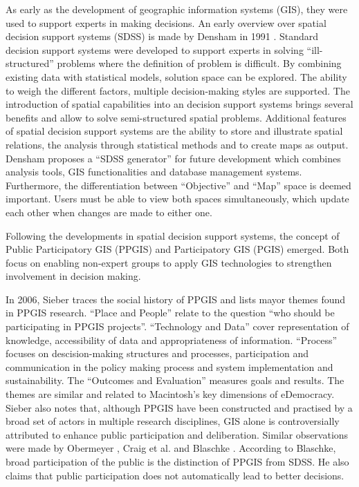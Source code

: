 As early as the development of geographic information systems (GIS), they were used to support experts in making decisions. An early overview over spatial decision support systems (SDSS) is made by Densham in 1991 \cite{densham_sdss}. Standard decision support systems were developed to support experts in solving ``ill-structured'' problems where the definition of problem is difficult. By combining existing data with statistical models, solution space can be explored. The ability to weigh the different factors, multiple decision-making styles are supported. The introduction of spatial capabilities into an decision support systems brings several benefits and allow to solve semi-structured spatial problems. Additional features of spatial decision support systems are the ability to store and illustrate spatial relations, the analysis through statistical methods and to create maps as output. Densham proposes a ``SDSS generator'' for future development which combines analysis tools, GIS functionalities and database management systems. Furthermore, the differentiation between ``Objective'' and ``Map'' space is deemed important. Users must be able to view both spaces simultaneously, which update each other when changes are made to either one.

Following the developments in spatial decision support systems, the concept of Public Participatory GIS (PPGIS) and Participatory GIS (PGIS) emerged. Both focus on enabling non-expert groups to apply GIS technologies to strengthen involvement in decision making.

In 2006, Sieber \cite{Sieber2006_PublicParticipationGIS} traces the social history of PPGIS and lists mayor themes found in PPGIS research. ``Place and People'' relate to the question ``who should be participating in PPGIS projects''. ``Technology and Data'' cover representation of knowledge, accessibility of data and appropriateness of information. ``Process'' focuses on descision-making structures and processes, participation and communication in the policy making process and system implementation and sustainability. The ``Outcomes and Evaluation'' measures goals and results. The themes are similar and related to Macintosh's \cite{Macintosh2004_eParticipation_characterization} key dimensions of eDemocracy. Sieber also notes that, although PPGIS have been constructed and practised by a broad set of actors in multiple research disciplines, GIS alone is controversially attributed to enhance public participation and deliberation. Similar observations were made by Obermeyer \cite{obermeyer1998evolution}, Craig et al. \cite{Weiner2002_Participation_and_GIS_eigentlich_Craig} and Blaschke \cite{Blaschke2004_PGIS_critically_revised}. According to Blaschke, broad participation of the public is the distinction of PPGIS from SDSS. He also claims that public participation does not automatically lead to better decisions.

